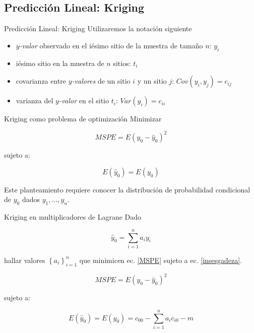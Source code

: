 \documentclass[12pts]{beamer}
\begin{document}
	\subsection{Predicción Lineal: Kriging}
	\begin{frame}{Predicción Lineal: Kriging}
		Utilizaremos la notación siguiente
		\begin{itemize}
			\item \textit{$y$-valor} observado en el iésimo sitio de la muestra de tamaño $n$: $y_i$
			\item iésimo sitio en la muestra de $n$ sitios: $t_i$
			\item covarianza entre \textit{$y$-valores} de un sitio $i$ y un sitio $j$: $Cov(y_i, y_j) = c_{ij}$
			\item varianza del \textit{$y$-valor} en el sitio $t_i$: $Var(y_i) = c_{ii}$	
		\end{itemize}
	\end{frame}

	\begin{frame}{Kriging como problema de optimización}
		Minimizar
		
		\begin{equation}
		MSPE = E\left(y_0 - \hat{y}_0\right)^2\label{MSPE}
		\end{equation}
		
		sujeto a:
		
		\begin{equation}
		E\left(\hat{y}_0\right) = E\left(y_0\right)\label{insesgadeza}
		\end{equation}
		
		Este planteamiento requiere conocer la distribución de probabilidad condicional de $y_0$ dados $y_1, ..., y_n$.
	\end{frame}

	\begin{frame}{Kriging en multiplicadores de Lagrane}
		Dado 
		
		\begin{equation}
		\hat{y}_0 = \sum_{i=1}^{n} a_i y_i\label{blup}
		\end{equation}
		
		\noindent hallar valores $\left\lbrace a_i \right\rbrace_{i=1}^{n}$ que minimicen ec. \ref{MSPE} sujeto a ec. \ref{insesgadeza}. 
		
		\begin{equation*}
		MSPE = E\left(y_0 - \hat{y}_0\right)^2%
		\end{equation*}
		
		sujeto a:
		
		\begin{equation*}
		E\left(\hat{y}_0\right) = E\left(y_0\right)= c_{00} - \sum_{i=1}^{n}a_i c_{i0} - m\label{MSPE_kriging}%
		\end{equation*}
	\end{frame}
\end{document}
